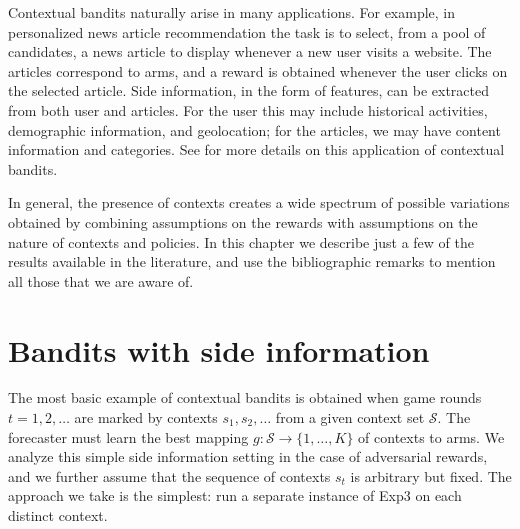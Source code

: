 \documentclass[11pt]{hackednow}
\newcommand{\cS}{\mathcal{S}}
\begin{document}
Contextual bandits naturally arise in many applications. For example, in personalized news article recommendation the task is to select, from a pool of candidates, a news article to display whenever a new user visits a website. The articles correspond to arms, and a reward is obtained whenever the user clicks on the selected article. Side information, in the form of features, can be extracted from both user and articles. For the user this may include historical activities, demographic information, and geolocation; for the articles, we may have content information and categories. See \cite{li2010contextual} for more details on this application of contextual bandits.


In general, the presence of contexts creates a wide spectrum of possible variations obtained by combining assumptions on the rewards with assumptions on the nature of contexts and policies. In this chapter we describe just a few of the results available in the literature, and use the bibliographic remarks to mention all those that we are aware of.

\section{Bandits with side information}
\label{s:context-intro}
The most basic example of contextual bandits is obtained when game rounds $t=1,2,\dots$ are marked by contexts $s_1,s_2,\dots$ from a given context set $\cS$. The forecaster must learn the best mapping $g : \cS \to \{1,\dots,K\}$ of contexts to arms. We analyze this simple side information setting in the case of adversarial rewards, and we further assume that the sequence of contexts $s_t$ is arbitrary but fixed. The approach we take is the simplest: run a separate instance of Exp3 on each distinct context.
\end{document}
